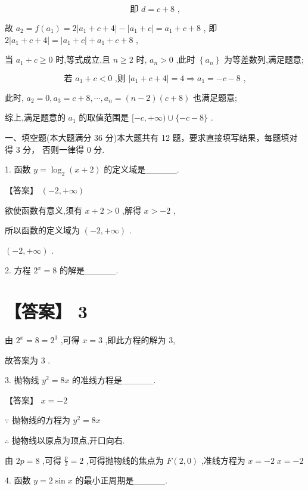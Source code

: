 \documentclass[10pt]{article}
\begin{document}
\[
\text{ 即 }d = c + 8\text{ , }
\]

故 \({a}_{2} = f\left( {a}_{1}\right)  = 2\left| {{a}_{1} + c + 4}\right|  - \left| {{a}_{1} + c}\right|  = {a}_{1} + c + 8\) , 即 \(2\left| {{a}_{1} + c + 4}\right|  = \left| {{a}_{1} + c}\right|  + {a}_{1} + c + 8\) ,

当 \({a}_{1} + c \geq  0\) 时,等式成立,且 \(n \geq  2\) 时, \({a}_{n} > 0\) ,此时 \(\left\{  {a}_{n}\right\}\) 为等差数列,满足题意;

\[
\text{ 若 }{a}_{1} + c < 0\text{ ,则 }\left| {{a}_{1} + c + 4}\right|  = 4 \Rightarrow  {a}_{1} =  - c - 8\text{ , }
\]

此时, \({a}_{2} = 0,{a}_{3} = c + 8,\cdots ,{a}_{n} = \left( {n - 2}\right) \left( {c + 8}\right)\) 也满足题意;

综上,满足题意的 \({a}_{1}\) 的取值范围是 \(\lbrack  - c, + \infty ) \cup  \{  - c - 8\}\) .

一、填空题(本大题满分 36 分)本大题共有 12 题，要求直接填写结果，每题填对得 3 分， 否则一律得 0 分.

1. 函数 \(y = {\log }_{2}\left( {x + 2}\right)\) 的定义域是\_\_\_\_\_.

【答案】 \(\left( {-2, + \infty }\right)\)

欲使函数有意义,须有 \(x + 2 > 0\) ,解得 \(x >  - 2\) ,

所以函数的定义域为 \(\left( {-2, + \infty }\right)\) .

\(\left( {-2, + \infty }\right)\) .

2. 方程 \({2}^{x} = 8\) 的解是\_\_\_\_\_.

\section*{【答案】 3}

由 \({2}^{x} = 8 = {2}^{3}\) ,可得 \(x = 3\) ,即此方程的解为 3,

故答案为 3 .

3. 抛物线 \({y}^{2} = {8x}\) 的准线方程是\_\_\_\_\_.

【答案】 \(x =  - 2\)

\(\because\) 抛物线的方程为 \({y}^{2} = {8x}\)

\(\therefore\) 抛物线以原点为顶点,开口向右.

由 \({2p} = 8\) ,可得 \(\frac{p}{2} = 2\) ,可得抛物线的焦点为 \(F\left( {2,0}\right)\) ,准线方程为 \(x =  - 2 \; x =  - 2\)

4. 函数 \(y = 2\sin x\) 的最小正周期是\_\_\_\_\_.
\end{document}
